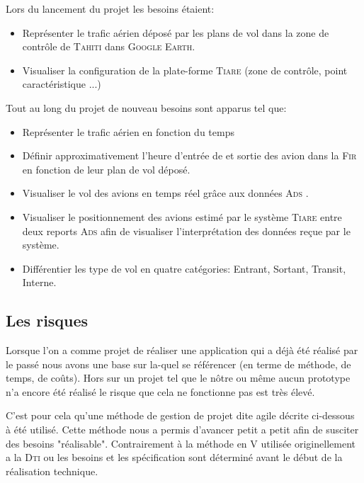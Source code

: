 Lors du lancement du projet les besoins étaient:
\begin{itemize}
    \item Représenter le trafic aérien déposé par les plans de vol dans la zone de contrôle de \textsc{Tahiti} dans \textsc{Google Earth}.
    \item Visualiser la configuration de la plate-forme \textsc{Tiare} (zone de contrôle, point caractéristique ...)
\end{itemize}\medskip
Tout au long du projet de nouveau besoins sont apparus tel que:
\begin{itemize}
    \item Représenter le trafic aérien en fonction du temps
    \item Définir approximativement l'heure d'entrée de et sortie des avion dans la \textsc{Fir}  en fonction de leur plan de vol déposé.
    \item Visualiser le vol des avions en temps réel grâce aux données \textsc{Ads} .
    \item Visualiser le positionnement des avions estimé par le système \textsc{Tiare} entre deux reports \textsc{Ads} afin de visualiser l'interprétation des données reçue par le système.
    \item Différentier les type de vol en quatre catégories: Entrant, Sortant, Transit, Interne. 
\end{itemize}\medskip

    \subsection{Les risques}
Lorsque l'on a comme projet de réaliser une application qui a déjà été réalisé par le passé nous avons une base sur la-quel se référencer (en terme de méthode, de temps, de coûts). Hors sur un projet tel que le nôtre ou même aucun prototype n'a encore été réalisé le risque que cela ne fonctionne pas est très élevé.

C'est pour cela qu'une méthode de gestion de projet dite agile décrite ci-dessous  à été utilisé. Cette méthode nous a permis d'avancer petit a petit afin de susciter des besoins "réalisable". Contrairement à la méthode en V utilisée originellement a la \textsc{Dti} ou les besoins et les spécification sont déterminé avant le début de la réalisation technique.
